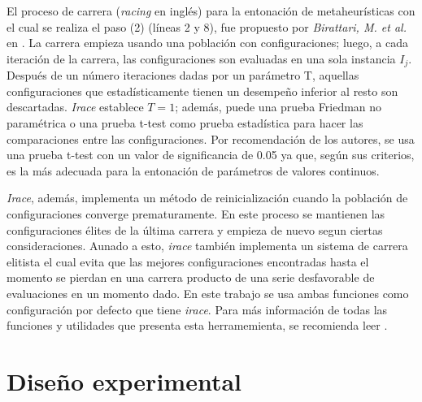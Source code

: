 El proceso de carrera (\emph{racing} en inglés) para la entonación de metaheurísticas con el cual se realiza el paso (2) (líneas 2 y 8), fue propuesto por \emph{Birattari, M. et al.} en \cite{birattari2002racing}. La carrera empieza usando una población con configuraciones; luego, a cada iteración de la carrera, las configuraciones son evaluadas en una sola instancia $I_j$. Después de un número iteraciones dadas por un parámetro T, aquellas configuraciones que estadísticamente tienen un desempeño inferior al resto son descartadas. \emph{Irace} establece  $T = 1$; además, puede una prueba Friedman no paramétrica o una prueba t-test como prueba estadística para hacer las comparaciones entre las configuraciones. Por recomendación de los autores, se usa una prueba t-test con un valor de significancia de 0.05 ya que, según sus criterios, es la más adecuada para la entonación de parámetros de valores continuos.

\emph{Irace}, además, implementa un método de reinicialización cuando la población de configuraciones converge prematuramente. En este proceso se mantienen las configuraciones élites de la última carrera y empieza de nuevo segun ciertas consideraciones. Aunado a esto, \emph{irace} también implementa un sistema de carrera elitista el cual evita que las mejores configuraciones encontradas hasta el momento se pierdan en una carrera producto de una serie desfavorable de evaluaciones en un momento dado. En este trabajo se usa ambas funciones como configuración por defecto que tiene \emph{irace}. Para más información de todas las funciones y utilidades que presenta esta herramemienta, se recomienda leer \cite{lopez2016irace}.

\section{Diseño experimental}